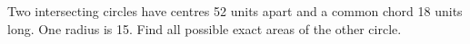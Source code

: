 Two intersecting circles have centres 52 units apart and a common chord 18 units long. One radius is 15. Find all possible exact areas of the other circle.
